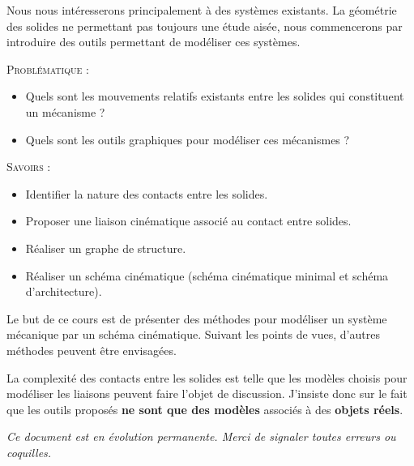 \documentclass[10pt,oneside]{article}
\begin{document}
Nous nous intéresserons principalement à des systèmes existants. La géométrie des solides ne permettant pas toujours une étude aisée, nous commencerons par introduire des outils permettant de modéliser ces systèmes. 

\begin{prob}
\textsc{Problématique :}
\begin{itemize}
\item Quels sont les mouvements relatifs existants entre les solides qui constituent un mécanisme ?
\item Quels sont les outils graphiques pour modéliser ces mécanismes ?
\end{itemize}
\end{prob}

\begin{savoir}
\textsc{Savoirs :}
\begin{itemize}
\item Identifier la nature des contacts entre les solides.
\item Proposer une liaison cinématique associé au contact entre solides.
\item Réaliser un graphe de structure.
\item Réaliser un schéma cinématique (schéma cinématique minimal et schéma d'architecture).
\end{itemize}
\end{savoir}

\begin{rem}
Le but de ce cours est de présenter des méthodes pour modéliser un système mécanique par un schéma cinématique. Suivant les points de vues, d'autres méthodes peuvent être envisagées.

La complexité des contacts entre les solides est telle que les modèles choisis pour modéliser les liaisons peuvent faire l'objet de discussion. J'insiste donc sur le fait que les outils proposés \textbf{ne sont que des modèles} associés à des \textbf{objets réels}.
\end{rem}

\setlength{\parskip}{0ex plus 0.2ex minus 0ex}
 \renewcommand{\contentsname}{}
 \renewcommand{\baselinestretch}{1}

\textit{Ce document est en évolution permanente. Merci de signaler toutes
erreurs ou coquilles.}

\tableofcontents

 \renewcommand{\baselinestretch}{1.2}
\setlength{\parskip}{2ex plus 0.5ex minus 0.2ex}
\end{document}
